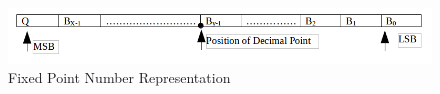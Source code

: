 \begin{figure}[!h]
\centering
\includegraphics[scale=0.55]{figures/fpformat.png}
\caption{Fixed Point Number Representation}
\label{fig:Fixed Representation}
\end{figure}